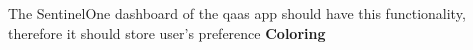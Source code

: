 \begin{multicols}{2}
      The SentinelOne dashboard of the \acrshort{qaas} app should have this functionality, therefore it should store user's preference
      \textbf{Coloring}
\end{multicols}